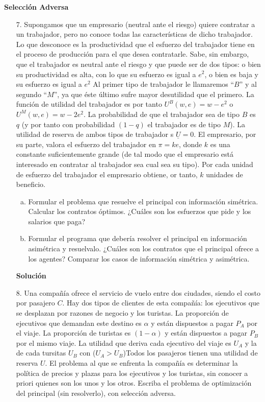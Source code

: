 \documentclass[10pt,a4paper]{article}
\begin{document}
\textbf{\LARGE Selección Adversa}
	\begin{enumerate}
		\item [7.] Supongamos que un empresario (neutral ante el riesgo) quiere contratar a un trabajador, pero no conoce todas las características de dicho trabajador. Lo que desconoce es la productividad que el esfuerzo del trabajador tiene en el proceso de producción para el que desea contratarle. Sabe, sin embargo, que el trabajador es neutral ante el riesgo y que puede ser de dos tipos: o bien su productividad es alta, con lo que su esfuerzo es igual a $e^{2}$, o bien es baja y su esfuerzo es igual a $e^{2}$
		Al primer tipo de trabajador le llamaremos  ``$B$'' y al segundo ``$M$'', ya que éste último sufre mayor desutilidad que el primero. La función de utilidad del trabajador es por tanto $U^{B}(w, e)=w-e^{2}$ o $U^{M}(w, e)=w-2e^{2}$. La probabilidad de que el trabajador sea de tipo $B$ es $q$ (y por tanto con probabilidad $(1-q)$ el trabajador es de tipo $M$). La utilidad de reserva de ambos tipos de trabajador s $\underline{U}=0 .$ El empresario, por su parte, valora el esfuerzo del trabajador en $\pi=ke$, donde $k$ es una constante suficientemente grande (de tal modo que el empresario está interesado en contratar al trabajador sea cual sea su tipo). Por cada unidad de esfuerzo del trabajador el empresario obtiene, or tanto, $k$ unidades de beneficio.
			\begin{enumerate}[a)]
				\item Formular el problema que resuelve el principal con información simétrica. Calcular los contratos óptimos. ¿Cuáles son los esfuerzos que pide y los salarios que paga?
				\item Formular el programa que debería resolver el principal en información asimétrica y resuelvalo. ¿Cuáles son los contratos que el principal ofrece a los agentes? Comparar los casos de información simétrica y asimétrica.
			\end{enumerate}
				\textbf{\large Solución}\\
					
		
		\item [8.] Una compañía ofrece el servicio de vuelo entre dos ciudades, siendo el costo por pasajero $C$. Hay dos tipos de clientes de esta compañía: los ejecutivos que se desplazan por razones de negocio y los turistas. La proporción de ejecutivos que demandan este destino es $\alpha$ y están dispuestos a pagar $P_A$ por el viaje. La proporción de turistas es $(1-\alpha)$ y están dispuestos a pagar $P_B$ por el mismo viaje. La utilidad que deriva cada ejecutivo del viaje es $U_A$ y la de cada tursitas $U_B$ con ($U_A > U_B$)Todos los pasajeros tienen una utilidad de reserva $U$. El problema al que se enfrenta la compañía es determinar la política de precios y plazas para los ejecutivos y los turistas, sin conocer a priori quienes son los unos y los otros. Escriba el problema de optimización del principal (sin resolverlo), con selección adversa.\\
		

\end{enumerate}
\end{document}
